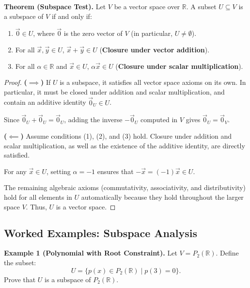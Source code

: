 \medskip
\noindent\textbf{Theorem (Subspace Test).} 
Let $V$ be a vector space over $\mathbb{R}$. A subset $U \subseteq V$ is a subspace of $V$ if and only if:
\begin{enumerate}[itemsep=0.8em, topsep=0.5em]
    \item $\vec{0} \in U$, where $\vec{0}$ is the zero vector of $V$ (in particular, $U \neq \emptyset$).
    \item For all $\vec{x}, \vec{y} \in U$, $\vec{x} + \vec{y} \in U$ (\textbf{Closure under vector addition}).
    \item For all $\alpha \in \mathbb{R}$ and $\vec{x} \in U$, $\alpha \vec{x} \in U$ (\textbf{Closure under scalar multiplication}).
\end{enumerate}

\begin{proof}
\noindent\textbf{($\implies$)} If $U$ is a subspace, it satisfies all vector space axioms on its own. In particular, it must be closed under addition and scalar multiplication, and contain an additive identity $\vec{0}_U \in U$. 

Since $\vec{0}_U + \vec{0}_U = \vec{0}_U$, adding the inverse $-\vec{0}_U$ computed in $V$ gives $\vec{0}_U = \vec{0}_V$.

\bigskip
\vspace{0.5em}

\noindent\textbf{($\impliedby$)} Assume conditions (1), (2), and (3) hold. Closure under addition and scalar multiplication, as well as the existence of the additive identity, are directly satisfied. 

For any $\vec{x} \in U$, setting $\alpha = -1$ ensures that $-\vec{x} = (-1)\vec{x} \in U$.

The remaining algebraic axioms (commutativity, associativity, and distributivity) hold for all elements in $U$ automatically because they hold throughout the larger space $V$. Thus, $U$ is a vector space.
\end{proof}

\subsection*{Worked Examples: Subspace Analysis}

\noindent\textbf{Example 1 (Polynomial with Root Constraint).}
Let $V = P_2(\mathbb{R})$. Define the subset:
\[ 
U = \{p(x) \in P_2(\mathbb{R}) \mid p(3) = 0\}.
\]
Prove that $U$ is a subspace of $P_2(\mathbb{R})$.

